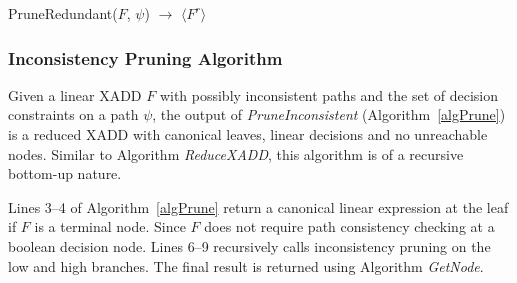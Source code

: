 \documentclass[twoside,11pt]{article}
\begin{document}
\incmargin{.5em}
\linesnumbered
\begin{algorithm}[t!]
\dontprintsemicolon
\BlankLine
{}
\caption{{\sc PruneRedundant}($F$, $\psi$) $\longrightarrow$ $\langle F^r \rangle$ \label{algPruneRedundant}}
\end{algorithm}
\decmargin{.5em}
\subsubsection{Inconsistency Pruning Algorithm}

Given a linear XADD $F$ with possibly inconsistent paths and the set of decision constraints on a path $\psi$, the output of \emph{PruneInconsistent} (Algorithm~\ref{algPrune}) is a reduced XADD with canonical leaves, linear decisions and no unreachable nodes. Similar to Algorithm \emph{ReduceXADD}, this algorithm is of a recursive bottom-up nature. 

Lines 3--4 of Algorithm~\ref{algPrune} return a canonical linear expression at the leaf if $F$ is a terminal node. Since $F$ does not require path consistency checking at a boolean decision node. Lines 6--9 recursively calls inconsistency pruning on the low and high branches. The final result is returned using Algorithm \emph{GetNode}.
\end{document}
